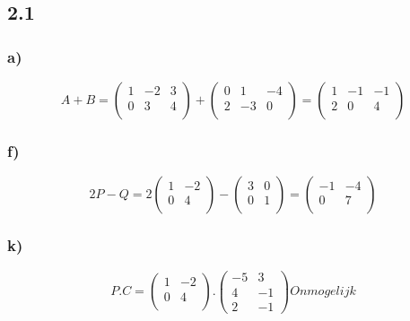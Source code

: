 \documentclass[11pt]{article}
\begin{document}
\subsection*{2.1}
\subsubsection*{a)}
\[
A+B=
\begin{pmatrix}
  1 & -2 & 3 \\
  0 & 3 & 4 \\
 \end{pmatrix}
 +
\begin{pmatrix}
  0 & 1 & -4 \\
  2 & -3 & 0 \\
 \end{pmatrix}
 =
 \begin{pmatrix}
  1 & -1 & -1 \\
  2 & 0 & 4 \\
 \end{pmatrix}
\]
\subsubsection*{f)}
\[
2P-Q=2
\begin{pmatrix}
  1 & -2 \\
  0 & 4 \\
 \end{pmatrix}
 -
\begin{pmatrix}
  3 & 0 \\
  0 & 1 \\
 \end{pmatrix}
 =
 \begin{pmatrix}
  -1 & -4 \\
  0 & 7 \\
 \end{pmatrix}
\]
\subsubsection*{k)}
\[
P.C=
\begin{pmatrix}
  1 & -2 \\
  0 & 4 \\
 \end{pmatrix}
 .
\begin{pmatrix}
  -5 & 3 \\
  4 & -1 \\
  2 & -1
 \end{pmatrix}
 Onmogelijk
\]
\end{document}
